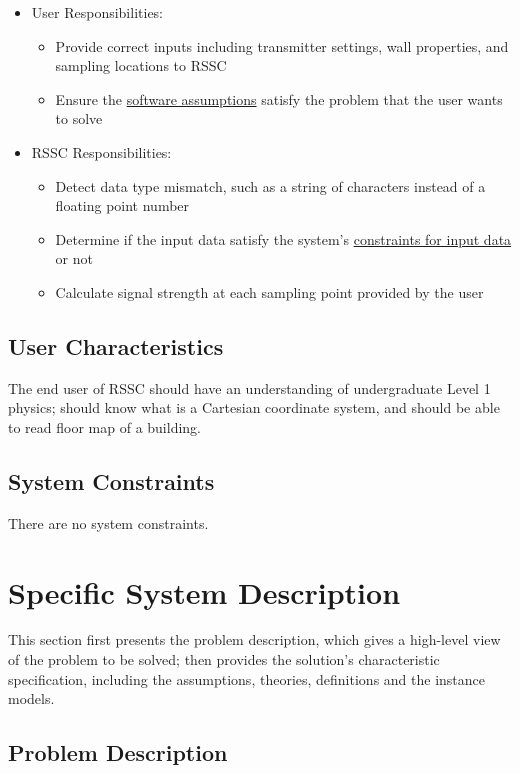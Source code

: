\documentclass[12pt]{article}
\begin{document}
\begin{itemize}
\item User Responsibilities:
\begin{itemize}
\item Provide correct inputs including transmitter settings, wall properties,
and sampling locations to RSSC
\item Ensure the \hyperref[sec_assumpt]{software assumptions} satisfy the 
problem that the user wants to solve
\end{itemize}
\item RSSC Responsibilities:
\begin{itemize}
\item Detect data type mismatch, such as a string of characters instead of a
  floating point number
\item Determine if the input data satisfy the system's \hyperref[sec_DataConstraints]{constraints for input data} or not
\item Calculate signal strength at each sampling point provided by the user
\end{itemize}
\end{itemize}

\subsection{User Characteristics} \label{SecUserCharacteristics}

The end user of RSSC should have an understanding of undergraduate Level 1
physics; should know what is a Cartesian coordinate system, and should be able
to read floor map of a building.

\subsection{System Constraints}
There are no system constraints.

\section{Specific System Description}

This section first presents the problem description, which gives a high-level
view of the problem to be solved; then provides the solution's characteristic
specification, including the assumptions, theories, definitions and
the instance models.

\subsection{Problem Description} \label{Sec_pd}
\end{document}
